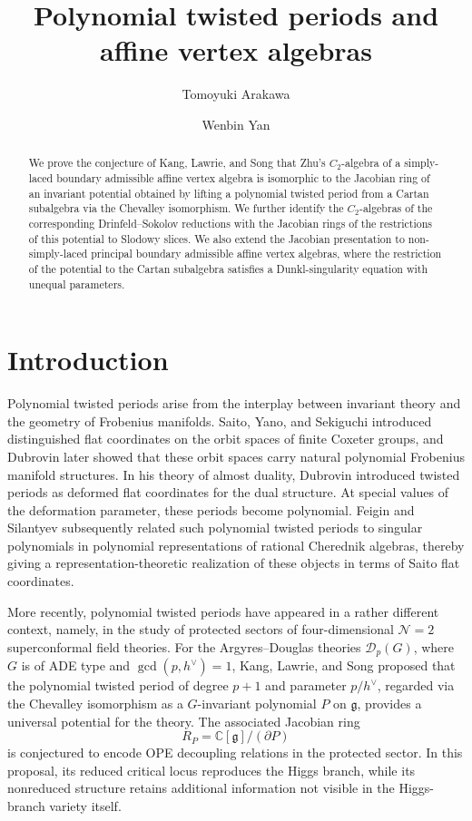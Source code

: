 \documentclass[11pt,reqno]{amsart}
\title{Polynomial twisted periods and affine vertex algebras}
\date{}
\author{Tomoyuki Arakawa}
\author{Wenbin Yan}
\theoremstyle{remark}
\begin{document}
\begin{abstract}
We prove the conjecture of Kang, Lawrie, and Song that Zhu's
$C_2$-algebra of a simply-laced boundary admissible affine vertex
algebra is isomorphic to the Jacobian ring of an invariant potential
obtained by lifting a polynomial twisted period from a Cartan
subalgebra via the Chevalley isomorphism. We further identify the
$C_2$-algebras of the corresponding Drinfeld--Sokolov reductions with
the Jacobian rings of the restrictions of this potential to Slodowy
slices.
We also extend the Jacobian presentation to non-simply-laced principal
boundary admissible affine vertex algebras, where the restriction of the
potential to the Cartan subalgebra satisfies a Dunkl-singularity equation with unequal
parameters.
\end{abstract}

\maketitle

\section{Introduction}

Polynomial twisted periods arise from the interplay between invariant
theory and the geometry of Frobenius manifolds. Saito, Yano, and
Sekiguchi \cite{SYS} introduced distinguished flat coordinates on the
orbit spaces of finite Coxeter groups, and Dubrovin \cite{Dub1} later
showed that these orbit spaces carry natural polynomial Frobenius
manifold structures. In his theory of almost duality, Dubrovin
\cite{Dub2} introduced twisted periods as deformed flat coordinates
for the dual structure. At special values of the deformation
parameter, these periods become polynomial. Feigin and Silantyev
\cite{FS} subsequently related such polynomial twisted periods to
singular polynomials in polynomial representations of rational
Cherednik algebras, thereby giving a representation-theoretic
realization of these objects in terms of Saito flat coordinates.

More recently, polynomial twisted periods have appeared in a rather
different context, namely, in the study of protected sectors of
four-dimensional $\mathcal N=2$ superconformal field theories. For the
Argyres--Douglas theories $\mathcal D_p(G)$, where $G$ is of ADE type
and $\gcd(p,h^\vee)=1$, Kang, Lawrie, and Song \cite{KLS} proposed that
the polynomial twisted period of degree $p+1$ and parameter
$p/h^\vee$, regarded via the Chevalley isomorphism as a $G$-invariant
polynomial $P$ on $\mathfrak g$, provides a universal potential for the
theory. The associated Jacobian ring
\[
R_P=\mathbb C[\mathfrak g]/(\partial P)
\]
is conjectured to encode OPE decoupling relations in the protected
sector. In this proposal, its reduced critical locus reproduces the Higgs branch, while
its nonreduced structure retains additional information not visible in
the Higgs-branch variety itself.
\end{document}
